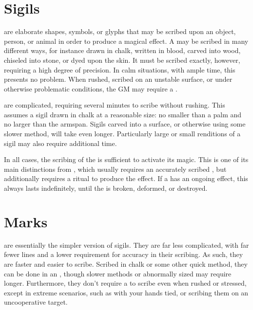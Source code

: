 
\section{Sigils}

\capital{\sigils} are elaborate shapes, symbols, or glyphs that may be scribed upon an object, person, or animal in order to produce a magical effect.
A {\sigil} may be scribed in many different ways, for instance drawn in chalk, written in blood, carved into wood, chiseled into stone, or dyed upon the skin.
It must be scribed exactly, however, requiring a high degree of precision.
In calm situations, with ample time, this presents no problem.
When rushed, scribed on an unstable surface, or under otherwise problematic conditions, the GM may require a  {\test}.

\capital{\sigils} are complicated, requiring several minutes to scribe without rushing.
This assumes a sigil drawn in chalk at a reasonable size: no smaller than a palm and no larger than the  armspan.
Sigils carved into a surface, or otherwise using some slower method, will take even longer.
Particularly large or small renditions of a sigil may also require additional time.

In all cases, the scribing of the {\sigil} is sufficient to activate its magic.
This is one of its main distinctions from , which usually requires an accurately scribed , but additionally requires a ritual to produce the effect.
If a {\sigil} has an ongoing effect, this always lasts indefinitely, until the {\sigil} is broken, deformed, or destroyed.

\section{Marks}

\capital{\sigilmarks} are essentially the simpler version of sigils.
They are far less complicated, with far fewer lines and a lower requirement for accuracy in their scribing.
As such, they are faster and easier to scribe.
Scribed in chalk or some other quick method, they can be done in an {\action}, though slower methods or abnormally sized {\sigilmarks} may require longer.
Furthermore, they don't require a {\test} to scribe even when rushed or stressed, except in extreme scenarios, such as with your hands tied, or scribing them on an uncooperative target.


